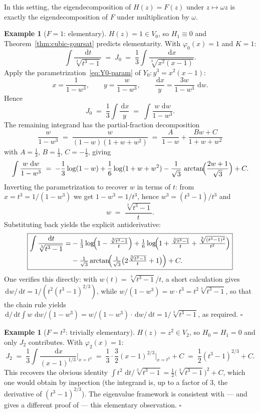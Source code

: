 \documentclass[11pt,a4paper]{article}
\theoremstyle{plain}
\theoremstyle{definition}
\newtheorem{example}[theorem]{Example}
\theoremstyle{remark}
\renewcommand{\d}{\,\mathrm{d}}
\begin{document}
In this setting, the eigendecomposition of $H(z)=F(z)$ under $z\mapsto\omega z$ is exactly the eigendecomposition of $F$ under multiplication by $\omega$.

\begin{example}[$F=1$: elementary]\label{ex:F1}
$H(z)=1\in V_0$, so $H_1\equiv 0$ and Theorem~\ref{thm:cubic-goursat} predicts elementarity. With $\varphi_0(x)=1$ and $K=1$:
\[
  \int \frac{\d t}{\sqrt[3]{t^3-1}} \;=\; J_0 \;=\; \frac{1}{3}\int \frac{\d x}{\sqrt[3]{x^2(x-1)}}.
\]
Apply the parametrization~\eqref{eq:Y0-param} of $Y_0\colon y^3=x^2(x-1)$:
\[
  x = \frac{1}{1-w^3},\qquad y = \frac{w}{1-w^3},\qquad \frac{\d x}{y} = \frac{3w}{1-w^3}\,\d w.
\]
Hence
\[
  J_0 \;=\; \frac{1}{3}\int \frac{\d x}{y} \;=\; \int \frac{w\,\d w}{1-w^3}.
\]
The remaining integrand has the partial-fraction decomposition
\[
  \frac{w}{1-w^3} \;=\; \frac{w}{(1-w)(1+w+w^2)} \;=\; \frac{A}{1-w} + \frac{Bw+C}{1+w+w^2}
\]
with $A=\tfrac{1}{3}$, $B=\tfrac{1}{3}$, $C=-\tfrac{1}{3}$, giving
\[
  \int \frac{w\,\d w}{1-w^3} \;=\; -\frac{1}{3}\log(1-w) + \frac{1}{6}\log(1+w+w^2) - \frac{1}{\sqrt{3}}\,\arctan\!\Bigl(\frac{2w+1}{\sqrt{3}}\Bigr) + C.
\]
Inverting the parametrization to recover $w$ in terms of $t$: from $x=t^3=1/(1-w^3)$ we get $1-w^3=1/t^3$, hence $w^3 = (t^3-1)/t^3$ and
\[
  w \;=\; \frac{\sqrt[3]{t^3-1}}{t}.
\]
Substituting back yields the explicit antiderivative:
\[
\boxed{
\begin{aligned}
  \int \frac{\d t}{\sqrt[3]{t^3-1}}
   = &-\tfrac{1}{3}\log\!\Bigl(1-\tfrac{\sqrt[3]{t^3-1}}{t}\Bigr)
     + \tfrac{1}{6}\log\!\Bigl(1+\tfrac{\sqrt[3]{t^3-1}}{t} + \tfrac{\sqrt[3]{(t^3-1)^2}}{t^2}\Bigr) \\
   & - \tfrac{1}{\sqrt{3}}\arctan\!\Bigl(\tfrac{1}{\sqrt{3}}\bigl(2\tfrac{\sqrt[3]{t^3-1}}{t} + 1\bigr)\Bigr) + C.
\end{aligned}
}
\]
One verifies this directly: with $w(t) = \sqrt[3]{t^3-1}/t$, a short calculation gives $\d w/\d t = 1/(t^2(t^3-1)^{2/3})$, while $w/(1-w^3) = w\cdot t^3 = t^2 \sqrt[3]{t^3-1}$, so that the chain rule yields $\d/\d t \int w\,\d w/(1-w^3) = w/(1-w^3)\cdot \d w/\d t = 1/\sqrt[3]{t^3-1}$, as required. \hfill$\square$
\end{example}

\begin{example}[$F=t^2$: trivially elementary]\label{ex:Ft2}
$H(z)=z^2\in V_2$, so $H_0=H_1=0$ and only $J_2$ contributes. With $\varphi_2(x)=1$:
\[
  J_2 \;=\; \frac{1}{3}\int \frac{\d x}{(x-1)^{1/3}}\bigg|_{x=t^3} \;=\; \frac{1}{3}\cdot\frac{3}{2}(x-1)^{2/3}\bigg|_{x=t^3} + C \;=\; \frac{1}{2}(t^3-1)^{2/3} + C.
\]
This recovers the obvious identity $\int t^2\,\d t/\sqrt[3]{t^3-1} = \tfrac{1}{2}\bigl(\sqrt[3]{t^3-1}\bigr)^2 + C$, which one would obtain by inspection (the integrand is, up to a factor of $3$, the derivative of $(t^3-1)^{2/3}$). The eigenvalue framework is consistent with --- and gives a different proof of --- this elementary observation. \hfill$\square$
\end{example}
\end{document}
